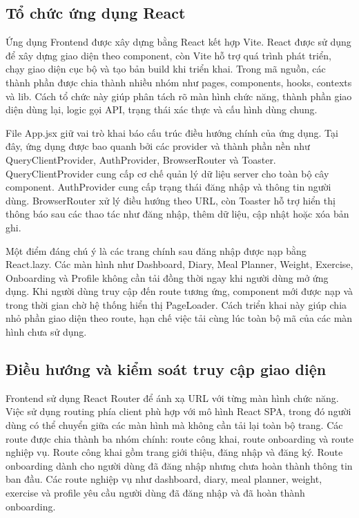 \documentclass[12pt, a4paper]{report}
\begin{document}
\subsection{Tổ chức ứng dụng React}Ứng dụng Frontend được xây dựng bằng React kết hợp Vite. React được sử dụng để xây dựng giao diện theo component, còn Vite hỗ trợ quá trình phát triển, chạy giao diện cục bộ và tạo bản build khi triển khai. Trong mã nguồn, các thành phần được chia thành nhiều nhóm như pages, components, hooks, contexts và lib. Cách tổ chức này giúp phân tách rõ màn hình chức năng, thành phần giao diện dùng lại, logic gọi API, trạng thái xác thực và cấu hình dùng chung.

File App.jsx giữ vai trò khai báo cấu trúc điều hướng chính của ứng dụng. Tại đây, ứng dụng được bao quanh bởi các provider và thành phần nền như QueryClientProvider, AuthProvider, BrowserRouter và Toaster. QueryClientProvider cung cấp cơ chế quản lý dữ liệu server cho toàn bộ cây component. AuthProvider cung cấp trạng thái đăng nhập và thông tin người dùng. BrowserRouter xử lý điều hướng theo URL, còn Toaster hỗ trợ hiển thị thông báo sau các thao tác như đăng nhập, thêm dữ liệu, cập nhật hoặc xóa bản ghi.

Một điểm đáng chú ý là các trang chính sau đăng nhập được nạp bằng React.lazy. Các màn hình như Dashboard, Diary, Meal Planner, Weight, Exercise, Onboarding và Profile không cần tải đồng thời ngay khi người dùng mở ứng dụng. Khi người dùng truy cập đến route tương ứng, component mới được nạp và trong thời gian chờ hệ thống hiển thị PageLoader. Cách triển khai này giúp chia nhỏ phần giao diện theo route, hạn chế việc tải cùng lúc toàn bộ mã của các màn hình chưa sử dụng.

\subsection{Điều hướng và kiểm soát truy cập giao diện}Frontend sử dụng React Router để ánh xạ URL với từng màn hình chức năng. Việc sử dụng routing phía client phù hợp với mô hình React SPA, trong đó người dùng có thể chuyển giữa các màn hình mà không cần tải lại toàn bộ trang. Các route được chia thành ba nhóm chính: route công khai, route onboarding và route nghiệp vụ. Route công khai gồm trang giới thiệu, đăng nhập và đăng ký. Route onboarding dành cho người dùng đã đăng nhập nhưng chưa hoàn thành thông tin ban đầu. Các route nghiệp vụ như dashboard, diary, meal planner, weight, exercise và profile yêu cầu người dùng đã đăng nhập và đã hoàn thành onboarding.
\end{document}
